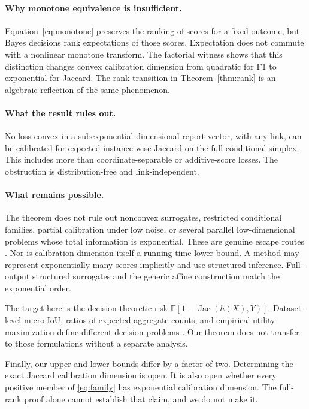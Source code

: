 \documentclass{article}
\newcommand{\E}{\mathbb E}
\newcommand{\1}{\mathbf 1}
\newcommand{\Jac}{\operatorname{Jac}}
\begin{document}
\paragraph{Why monotone equivalence is insufficient.}
Equation~\eqref{eq:monotone} preserves the ranking of scores for a fixed outcome, but Bayes decisions rank expectations of those scores. Expectation does not commute with a nonlinear monotone transform. The factorial witness shows that this distinction changes convex calibration dimension from quadratic for F1 to exponential for Jaccard. The rank transition in Theorem~\ref{thm:rank} is an algebraic reflection of the same phenomenon.

\paragraph{What the result rules out.}
No loss convex in a subexponential-dimensional report vector, with any link, can be calibrated for expected instance-wise Jaccard on the full conditional simplex. This includes more than coordinate-separable or additive-score losses. The obstruction is distribution-free and link-independent.

\paragraph{What remains possible.}
The theorem does not rule out nonconvex surrogates, restricted conditional families, partial calibration under low noise, or several parallel low-dimensional problems whose total information is exponential. These are genuine escape routes \citep{nueve2024tradeoff}. Nor is calibration dimension itself a running-time lower bound. A method may represent exponentially many scores implicitly and use structured inference. Full-output structured surrogates \citep{mao2023structured} and the generic affine construction match the exponential order.

The target here is the decision-theoretic risk $\E[1-\Jac(h(X),Y)]$. Dataset-level micro IoU, ratios of expected aggregate counts, and empirical utility maximization define different decision problems \citep{nowozin2014iou,mohri2026mmo}. Our theorem does not transfer to those formulations without a separate analysis.

Finally, our upper and lower bounds differ by a factor of two. Determining the exact Jaccard calibration dimension is open. It is also open whether every positive member of \eqref{eq:family} has exponential calibration dimension. The full-rank proof alone cannot establish that claim, and we do not make it.




\appendix

\end{document}
